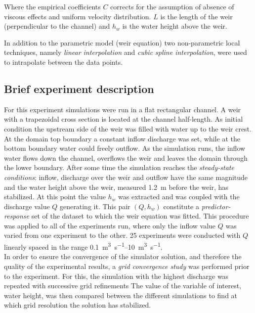 \noindent Where the empirical coefficients $C$ corrects for the assumption of absence of viscous effects and uniform velocity distribution. $L$ is the length of the weir (perpendicular to the channel) and $h_w$ is the water height above the weir.

In addition to the parametric model (weir equation) two non-parametric local techniques, namely \emph{linear interpolation} and \emph{cubic spline interpolation}, were used to intrapolate between the data points.\\


\subsection{Brief experiment description}

 
 For this experiment simulations were run in a flat rectangular channel.
A weir with a trapezoidal cross section is located at the channel half-length.
As initial condition the upstream side of the weir was filled with water up to the weir crest.
At the domain top boundary a constant inflow discharge was set, while at the bottom boundary water could freely outflow.
As the simulation runs, the inflow water flows down the channel, overflows the weir and leaves the domain through the lower boundary.
After some time the simulation reaches the \emph{steady-state conditions}: inflow, discharge over the weir and outflow have the same magnitude and the water height above the weir, measured \SI{1.2}{\meter} before the weir, has stabilized.
At this point the value $h_w$ was extracted and was coupled with the discharge value $Q$ generating it.
This pair $(Q, h_w)$ constitute a \emph{predictor-response} set of the dataset to which the weir equation was fitted.
This procedure was applied to all of the experiments run, where only the inflow value $Q$ was varied from one experiment to the other.
\num{25} experiments were conducted with $Q$ linearly spaced in the range \SIrange{0.1}{10}{\cubic\meter\per\second}. \\

In order to ensure the convergence of the simulator solution, and therefore the quality of the experimental results, a \emph{grid convergence study} was performed prior to the experiment.
For this, the simulation with the highest discharge was repeated with successive grid refinements
The value of the variable of interest, water height, was then compared between the different simulations to find at which grid resolution the solution has stabilized.


